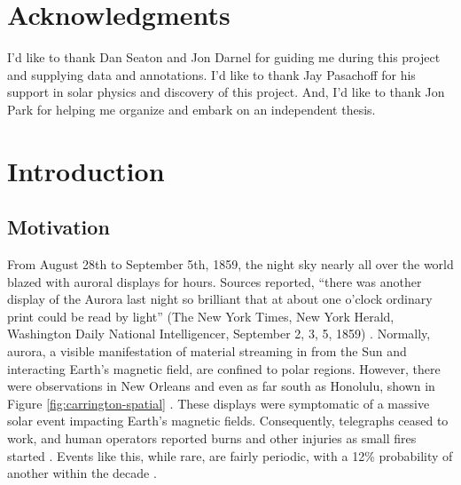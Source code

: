 \documentclass[twoside]{report}
\begin{document}
\chapter*{Acknowledgments}
I'd like to thank Dan Seaton and Jon Darnel for guiding me during this project and supplying data and annotations.  I'd like to thank Jay Pasachoff for his support in solar physics and discovery of this project. And, I'd like to thank Jon Park for helping me organize and embark on an independent thesis.

\chapter{Introduction}
\section{Motivation}
From August 28th to September 5th, 1859, the night sky nearly all over the world blazed with auroral displays for hours. Sources reported, ``there was another display of the Aurora last night so brilliant that at about one o’clock ordinary print could be read by light'' (The New York Times, New York Herald, Washington Daily National Intelligencer, September 2, 3, 5, 1859) \cite{green:2006}. Normally, aurora, a visible manifestation of material streaming in from the Sun and interacting Earth's magnetic field, are confined to polar regions. However, there were observations in New Orleans and even as far south as Honolulu, shown in Figure \ref{fig:carrington-spatial}  \cite{cliver:2004}. These displays were symptomatic of a massive solar event impacting Earth's magnetic fields. Consequently, telegraphs ceased to work, and human operators reported burns and other injuries as small fires started \cite{green:2006}. Events like this, while rare, are fairly periodic, with a 12\% probability of another within the decade \cite{riley:2012}. 
\end{document}
